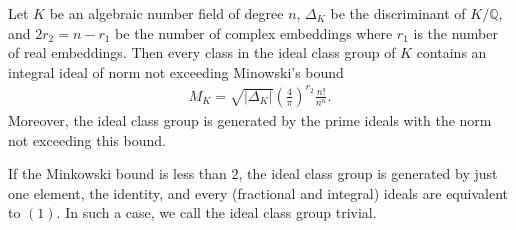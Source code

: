 \begin{thmbox}
    \begin{theorem}
        Let \(K\) be an algebraic number field of degree \(n\), \(\Delta_K\) be the discriminant of \(K / \mathbb{Q}\), and \(2 r_2 = n - r_1\) be the number of complex embeddings where \(r_1\) is the number of real embeddings. Then every class in the ideal class group of \(K\) contains an integral ideal of norm not exceeding Minowski's bound
        \begin{align*}
            M_K = \sqrt{|\Delta_K|} \left( \frac{4}{\pi} \right)^{r_2} \frac{n!}{n^n} \text{.}
        \end{align*}
        Moreover, the ideal class group is generated by the prime ideals with the norm not exceeding this bound.
    \end{theorem}
\end{thmbox}

\begin{example}
    If the Minkowski bound is less than \(2\), the ideal class group is generated by just one element, the identity, and every (fractional and integral) ideals are equivalent to \((1)\). In such a case, we call the ideal class group trivial.
\end{example}

